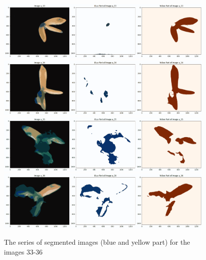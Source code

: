 \documentclass{article}
\begin{document}
\begin{figure}[h!]
\centering
\includegraphics[width=0.95\textwidth]{Report/Images/Appendix Images/ColorSegments/Image33.png}
\includegraphics[width=0.95\textwidth]{Report/Images/Appendix Images/ColorSegments/Image34.png}
\includegraphics[width=0.95\textwidth]{Report/Images/Appendix Images/ColorSegments/Image35.png}
\includegraphics[width=0.95\textwidth]{Report/Images/Appendix Images/ColorSegments/Image36.png}
\caption{The series of segmented images (blue and yellow part) for the images 33-36} 
\label{fig:segment33-36}
\end{figure}
\end{document}
